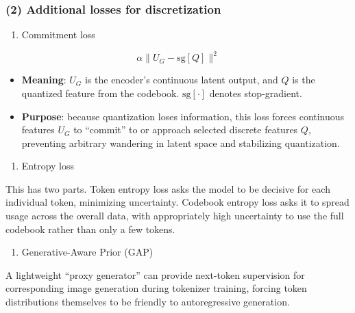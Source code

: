 \hypertarget{additional-losses-for-discretization}{%
\subsubsection{(2) Additional losses for discretization}\label{additional-losses-for-discretization}}

\begin{enumerate}
\def\labelenumi{\arabic{enumi}.}
\tightlist
\item
  Commitment loss
\end{enumerate}

\[
\alpha\lVert U_G-\mathrm{sg}[Q]\rVert^2
\]

\begin{itemize}
\tightlist
\item
  \textbf{Meaning}: \(U_G\) is the encoder's continuous latent output, and \(Q\) is the quantized feature from the codebook. \(\mathrm{sg}[\cdot]\) denotes stop-gradient.
\item
  \textbf{Purpose}: because quantization loses information, this loss forces continuous features \(U_G\) to ``commit'' to or approach selected discrete features \(Q\), preventing arbitrary wandering in latent space and stabilizing quantization.
\end{itemize}

\begin{enumerate}
\def\labelenumi{\arabic{enumi}.}
\setcounter{enumi}{1}
\tightlist
\item
  Entropy loss
\end{enumerate}

This has two parts. Token entropy loss asks the model to be decisive for each individual token, minimizing uncertainty. Codebook entropy loss asks it to spread usage across the overall data, with appropriately high uncertainty to use the full codebook rather than only a few tokens.

\begin{enumerate}
\def\labelenumi{\arabic{enumi}.}
\setcounter{enumi}{2}
\tightlist
\item
  Generative-Aware Prior (GAP)
\end{enumerate}

A lightweight ``proxy generator'' can provide next-token supervision for corresponding image generation during tokenizer training, forcing token distributions themselves to be friendly to autoregressive generation.

